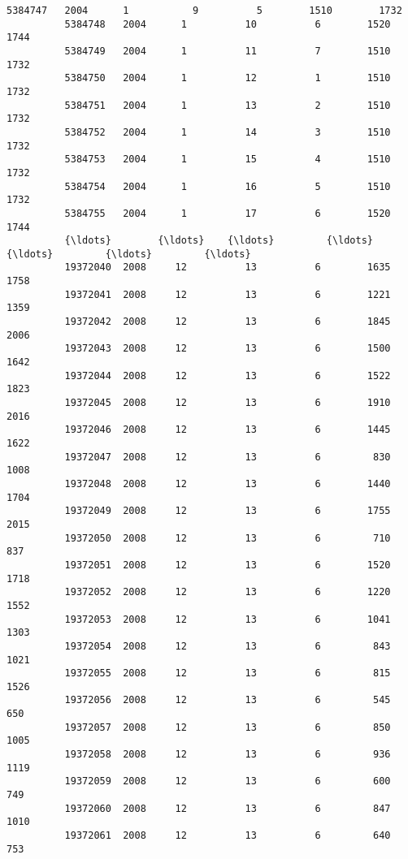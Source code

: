 \documentclass[11pt]{article}
\begin{document}
\begin{Verbatim}[commandchars=\\\{\}]
          5384747   2004      1           9          5        1510        1732   
          5384748   2004      1          10          6        1520        1744   
          5384749   2004      1          11          7        1510        1732   
          5384750   2004      1          12          1        1510        1732   
          5384751   2004      1          13          2        1510        1732   
          5384752   2004      1          14          3        1510        1732   
          5384753   2004      1          15          4        1510        1732   
          5384754   2004      1          16          5        1510        1732   
          5384755   2004      1          17          6        1520        1744   
          {\ldots}        {\ldots}    {\ldots}         {\ldots}        {\ldots}         {\ldots}         {\ldots}   
          19372040  2008     12          13          6        1635        1758   
          19372041  2008     12          13          6        1221        1359   
          19372042  2008     12          13          6        1845        2006   
          19372043  2008     12          13          6        1500        1642   
          19372044  2008     12          13          6        1522        1823   
          19372045  2008     12          13          6        1910        2016   
          19372046  2008     12          13          6        1445        1622   
          19372047  2008     12          13          6         830        1008   
          19372048  2008     12          13          6        1440        1704   
          19372049  2008     12          13          6        1755        2015   
          19372050  2008     12          13          6         710         837   
          19372051  2008     12          13          6        1520        1718   
          19372052  2008     12          13          6        1220        1552   
          19372053  2008     12          13          6        1041        1303   
          19372054  2008     12          13          6         843        1021   
          19372055  2008     12          13          6         815        1526   
          19372056  2008     12          13          6         545         650   
          19372057  2008     12          13          6         850        1005   
          19372058  2008     12          13          6         936        1119   
          19372059  2008     12          13          6         600         749   
          19372060  2008     12          13          6         847        1010   
          19372061  2008     12          13          6         640         753   

\end{Verbatim}
\end{document}
